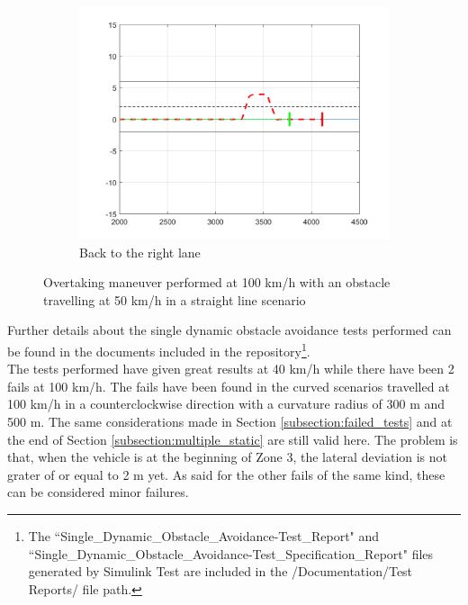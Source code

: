 \begin{figure}[H]
    \begin{subfigure}{.33\textwidth}
    \centering
    \includegraphics[width=1.1\textwidth,keepaspectratio]{Figures/overtake_single_dynamic_right.png}
    \caption{Back to the right lane}
    \label{subfig:single_right}
    \end{subfigure}
    \caption{Overtaking maneuver performed at 100 km/h with an obstacle travelling at 50 km/h in a straight line scenario}
    \label{fig:single_dynamic_obstacle_avoidance}
\end{figure}

Further details about the single dynamic obstacle avoidance tests performed can be found in the documents included in the repository\footnote{The ``Single\_Dynamic\_Obstacle\_Avoidance-Test\_Report" and ``Single\_Dynamic\_Obstacle\_Avoidance-Test\_Specification\_Report" files generated by Simulink Test are included in the /Documentation/Test Reports/ file path.}.\\

The tests performed have given great results at 40 km/h while there have been 2 fails at 100 km/h. The fails have been found in the curved scenarios travelled at 100 km/h in a counterclockwise direction with a curvature radius of 300 m and 500 m. The same considerations made in Section \ref{subsection:failed_tests} and at the end of Section \ref{subsection:multiple_static} are still valid here. The problem is that, when the vehicle is at the beginning of Zone 3, the lateral deviation is not grater of or equal to 2 m yet. As said for the other fails of the same kind, these can be considered minor failures.

